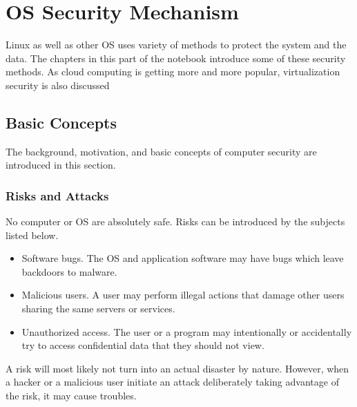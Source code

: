 \chapter{OS Security Mechanism}

Linux as well as other OS uses variety of methods to protect the system and the data. The chapters in this part of the notebook introduce some of these security methods. As cloud computing is getting more and more popular, virtualization security is also discussed

\section{Basic Concepts}

The background, motivation, and basic concepts of computer security are introduced in this section.

\subsection{Risks and Attacks}

No computer or OS are absolutely safe. Risks can be introduced by the subjects listed below.
\begin{itemize}
	\item Software bugs. The OS and application software may have bugs which leave backdoors to malware.
	\item Malicious users. A user may perform illegal actions that damage other users sharing the same servers or services.
	\item Unauthorized access. The user or a program may intentionally or accidentally try to access confidential data that they should not view.
\end{itemize}
A risk will most likely not turn into an actual disaster by nature. However, when a hacker or a malicious user initiate an attack deliberately taking advantage of the risk, it may cause troubles.

